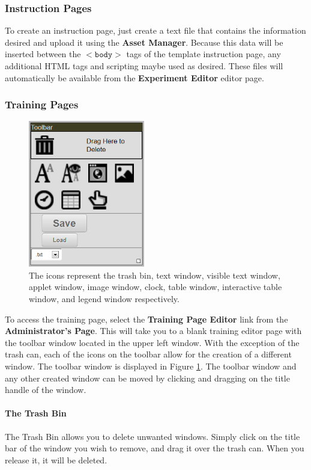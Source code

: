 \documentclass[article]{ij4uq}              %
\begin{document}
\subsubsection{Instruction Pages}
To create an instruction page, just create a text file that contains the information desired and upload it using the \textbf{Asset Manager}. Because this data will be inserted between the $<\texttt{body}>$ tags of the template instruction page, any additional HTML tags and scripting maybe used as desired. These files will automatically be available from the \textbf{Experiment Editor} editor page. 

\subsubsection{Training Pages}

\begin{figure}[h!]
 \centering
 \includegraphics[width=2.0in]{figures/toolbar.png}
 \caption{The icons represent the trash bin, text window, visible text window, applet window, image window, clock, table window, interactive table window, and legend window respectively.}
 \label{fig:tool}
\end{figure}
\FloatBarrier

To access the training page, select the \textbf{Training Page Editor} link from the \textbf{Administrator's Page}. This will take you to a blank training editor page with the toolbar window located in the upper left window. With the exception of the trash can, each of the icons on the toolbar allow for the creation of a different window. The toolbar window is displayed in Figure \ref{fig:tool}. The toolbar window and any other created window can be moved by clicking and dragging on the title handle of the window.

\paragraph{The Trash Bin}
The Trash Bin allows you to delete unwanted windows. Simply click on the title bar of the window you wish to remove, and drag it over the trash can. When you release it, it will be deleted.
\end{document}
